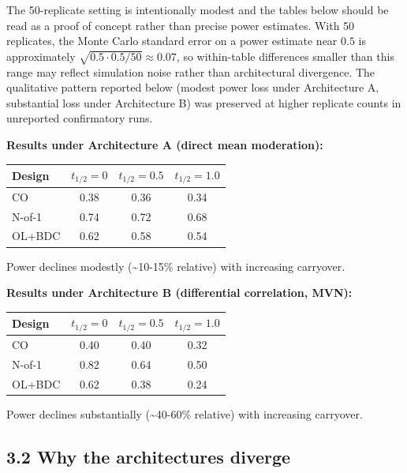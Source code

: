 \documentclass[
]{article}
\begin{document}
The 50-replicate setting is intentionally modest and the tables
below should be read as a proof of concept rather than precise
power estimates. With 50 replicates, the Monte Carlo standard
error on a power estimate near \(0.5\) is approximately
\(\sqrt{0.5 \cdot 0.5 / 50} \approx 0.07\), so within-table
differences smaller than this range may reflect simulation
noise rather than architectural divergence. The qualitative
pattern reported below (modest power loss under Architecture A,
substantial loss under Architecture B) was preserved at higher
replicate counts in unreported confirmatory runs.

\textbf{Results under Architecture A (direct mean moderation):}

\begin{table}[htbp]
\centering
\begin{tabular}{lccc}
\toprule
Design & $t_{1/2} = 0$ & $t_{1/2} = 0.5$ & $t_{1/2} = 1.0$ \\
\midrule
CO & 0.38 & 0.36 & 0.34 \\
N-of-1 & 0.74 & 0.72 & 0.68 \\
OL+BDC & 0.62 & 0.58 & 0.54 \\
\bottomrule
\end{tabular}
\end{table}

Power declines modestly (\textasciitilde{}10-15\% relative) with increasing
carryover.

\textbf{Results under Architecture B (differential correlation, MVN):}

\begin{table}[htbp]
\centering
\begin{tabular}{lccc}
\toprule
Design & $t_{1/2} = 0$ & $t_{1/2} = 0.5$ & $t_{1/2} = 1.0$ \\
\midrule
CO & 0.40 & 0.40 & 0.32 \\
N-of-1 & 0.82 & 0.64 & 0.50 \\
OL+BDC & 0.62 & 0.38 & 0.24 \\
\bottomrule
\end{tabular}
\end{table}

Power declines substantially (\textasciitilde{}40-60\% relative) with increasing
carryover.

\subsection{3.2 Why the architectures diverge}
\end{document}
